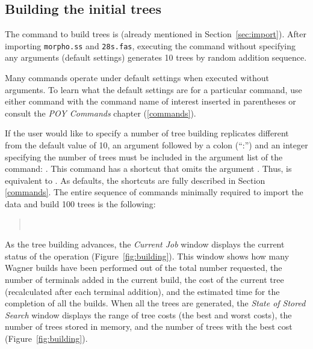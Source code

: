 {\subsection{Building the initial trees}

The command to build trees is  (already mentioned in Section~\ref{sec:import}). After 
importing \texttt{morpho.ss} and \texttt{28s.fas}, executing the command  without specifying 
any arguments (default settings) generates 10 trees by random addition sequence.

Many \poy commands operate under default settings when executed without arguments. To learn what the default settings 
are for a particular command, use either  command with the command name of interest inserted in 
parentheses or consult the \emph{POY Commands} chapter (\ref{commands}).

If the user would like to specify a number of tree building replicates different from the default value of 10, an argument 
 followed by a colon (``:'') and an integer specifying the number of trees must be included in the 
argument list of the  command: . This command has a shortcut 
that omits the argument . Thus,  is equivalent to . 
As defaults, the shortcuts are fully described in Section \ref{commands}. The entire sequence of commands minimally required 
to import the data and build 100 trees is the following:

\begin{quote}
 	\\
\end{quote}

As the tree building advances, the \emph{Current Job} window displays the current status of the operation (Figure~\ref{fig:building}). 
This window shows how many Wagner builds have been performed out of the total number requested, the number of terminals added
 in the current build, the cost of the current tree (recalculated after each terminal addition), and the estimated time for the completion of 
 all the builds. When all the trees are generated, the \emph{State of Stored Search} window displays the range of tree costs (the best 
 and worst costs), the number of trees stored in memory, and the number of trees with the best cost (Figure~\ref{fig:building}).

}
